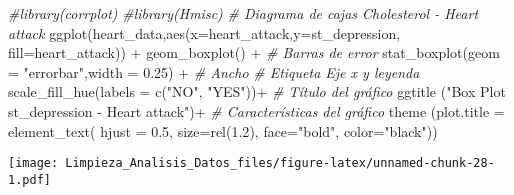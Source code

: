 \documentclass[
]{article}
\newenvironment{Shaded}{\begin{snugshade}}{\end{snugshade}}
\newcommand{\AttributeTok}[1]{\textcolor[rgb]{0.77,0.63,0.00}{#1}}
\newcommand{\CommentTok}[1]{\textcolor[rgb]{0.56,0.35,0.01}{\textit{#1}}}
\newcommand{\FloatTok}[1]{\textcolor[rgb]{0.00,0.00,0.81}{#1}}
\newcommand{\FunctionTok}[1]{\textcolor[rgb]{0.00,0.00,0.00}{#1}}
\newcommand{\NormalTok}[1]{#1}
\newcommand{\SpecialCharTok}[1]{\textcolor[rgb]{0.00,0.00,0.00}{#1}}
\newcommand{\StringTok}[1]{\textcolor[rgb]{0.31,0.60,0.02}{#1}}
\begin{document}
\begin{Shaded}
\begin{Highlighting}[]
\CommentTok{\#library(corrplot)}
\CommentTok{\#library(Hmisc)}
\CommentTok{\# Diagrama de cajas Cholesterol {-} Heart attack}
\FunctionTok{ggplot}\NormalTok{(heart\_data,}\FunctionTok{aes}\NormalTok{(}\AttributeTok{x=}\NormalTok{heart\_attack,}\AttributeTok{y=}\NormalTok{st\_depression, }\AttributeTok{fill=}\NormalTok{heart\_attack)) }\SpecialCharTok{+}
  \FunctionTok{geom\_boxplot}\NormalTok{() }\SpecialCharTok{+}
  \CommentTok{\# Barras de error}
  \FunctionTok{stat\_boxplot}\NormalTok{(}\AttributeTok{geom =} \StringTok{"errorbar"}\NormalTok{,}\AttributeTok{width =} \FloatTok{0.25}\NormalTok{) }\SpecialCharTok{+} \CommentTok{\# Ancho}
  \CommentTok{\# Etiqueta Eje x y leyenda}
  \FunctionTok{scale\_fill\_hue}\NormalTok{(}\AttributeTok{labels =} \FunctionTok{c}\NormalTok{(}\StringTok{"NO"}\NormalTok{, }\StringTok{"YES"}\NormalTok{))}\SpecialCharTok{+}
  \CommentTok{\# Título del gráfico}
  \FunctionTok{ggtitle}\NormalTok{ (}\StringTok{"Box Plot st\_depression {-} Heart attack"}\NormalTok{)}\SpecialCharTok{+}
  \CommentTok{\# Características del gráfico}
    \FunctionTok{theme}\NormalTok{ (}\AttributeTok{plot.title =} \FunctionTok{element\_text}\NormalTok{(}
        \AttributeTok{hjust =} \FloatTok{0.5}\NormalTok{,}
        \AttributeTok{size=}\FunctionTok{rel}\NormalTok{(}\FloatTok{1.2}\NormalTok{),}
        \AttributeTok{face=}\StringTok{"bold"}\NormalTok{, }
        \AttributeTok{color=}\StringTok{"black"}\NormalTok{))}
\end{Highlighting}
\end{Shaded}

\texttt{[image: Limpieza\_Analisis\_Datos\_files/figure-latex/unnamed-chunk-28-1.pdf]}
\end{document}
